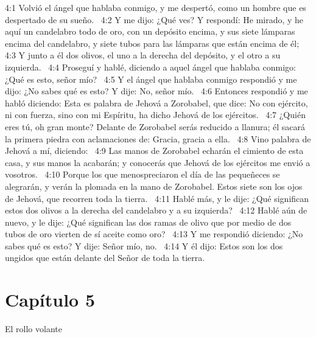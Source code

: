 4:1 Volvió el ángel que hablaba conmigo, y me despertó, como un hombre que es despertado de su sueño.  
4:2 Y me dijo: ¿Qué ves? Y respondí: He mirado, y he aquí un candelabro todo de oro, con un depósito encima, y sus siete lámparas encima del candelabro, y siete tubos para las lámparas que están encima de él;  
4:3 Y junto a él dos olivos, el uno a la derecha del depósito, y el otro a su izquierda.  
4:4 Proseguí y hablé, diciendo a aquel ángel que hablaba conmigo: ¿Qué es esto, señor mío?  
4:5 Y el ángel que hablaba conmigo respondió y me dijo: ¿No sabes qué es esto? Y dije: No, señor mío.  
4:6 Entonces respondió y me habló diciendo: Esta es palabra de Jehová a Zorobabel, que dice: No con ejército, ni con fuerza, sino con mi Espíritu, ha dicho Jehová de los ejércitos.  
4:7 ¿Quién eres tú, oh gran monte? Delante de Zorobabel serás reducido a llanura; él sacará la primera piedra con aclamaciones de: Gracia, gracia a ella.  
4:8 Vino palabra de Jehová a mí, diciendo:  
4:9 Las manos de Zorobabel echarán el cimiento de esta casa, y sus manos la acabarán; y conocerás que Jehová de los ejércitos me envió a vosotros.  
4:10 Porque los que menospreciaron el día de las pequeñeces se alegrarán, y verán la plomada en la mano de Zorobabel. Estos siete son los ojos de Jehová, que recorren toda la tierra.  
4:11 Hablé más, y le dije: ¿Qué significan estos dos olivos a la derecha del candelabro y a su izquierda?  
4:12 Hablé aún de nuevo, y le dije: ¿Qué significan las dos ramas de olivo que por medio de dos tubos de oro vierten de sí aceite como oro?  
4:13 Y me respondió diciendo: ¿No sabes qué es esto? Y dije: Señor mío, no.  
4:14 Y él dijo: Estos son los dos ungidos que están delante del Señor de toda la tierra.  
\section*{Capítulo 5 }
El rollo volante  

